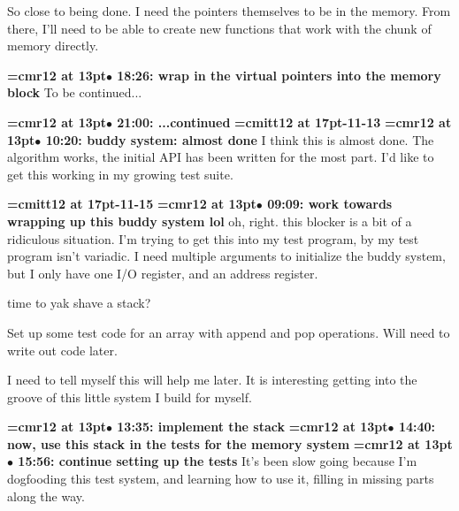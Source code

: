 So close to being done. I need the pointers themselves to be in the memory. From there, I'll need to be able to create new functions that work with the chunk of memory directly.
\par

{\smallskip\noindent\bf\font\titlefont=cmr12 at 13pt\titlefont $\bullet$ 18:26: wrap in the virtual pointers into the memory block}\smallskip
To be continued...
\par

{\smallskip\noindent\bf\font\titlefont=cmr12 at 13pt\titlefont $\bullet$ 21:00: ...continued}\smallskip
{\medskip\noindent\bf\font\titlefont=cmitt12 at 17pt-11-13}\medskip
{\smallskip\noindent\bf\font\titlefont=cmr12 at 13pt\titlefont $\bullet$ 10:20: buddy system: almost done}\smallskip
I think this is almost done. The algorithm works, the initial API has been written for the most part. I'd like to get this working in my growing test suite.
\par

{\medskip\noindent\bf\font\titlefont=cmitt12 at 17pt-11-15}\medskip
{\smallskip\noindent\bf\font\titlefont=cmr12 at 13pt\titlefont $\bullet$ 09:09: work towards wrapping up this buddy system lol}\smallskip
oh, right. this blocker is a bit of a ridiculous situation. I'm trying to get this into my test program, by my test program isn't variadic. I need multiple arguments to initialize the buddy system, but I only have one I/O register, and an address register.
\par

time to yak shave a stack?
\par

Set up some test code for an array with append and pop operations. Will need to write out code later.
\par

I need to tell myself this will help me later. It is interesting getting into the groove of this little system I build for myself.
\par

{\smallskip\noindent\bf\font\titlefont=cmr12 at 13pt\titlefont $\bullet$ 13:35: implement the stack}\smallskip
{\smallskip\noindent\bf\font\titlefont=cmr12 at 13pt\titlefont $\bullet$ 14:40: now, use this stack in the tests for the memory system}\smallskip
{\smallskip\noindent\bf\font\titlefont=cmr12 at 13pt\titlefont $\bullet$ 15:56: continue setting up the tests}\smallskip
It's been slow going because I'm dogfooding this test system, and learning how to use it, filling in missing parts along the way.
\par

